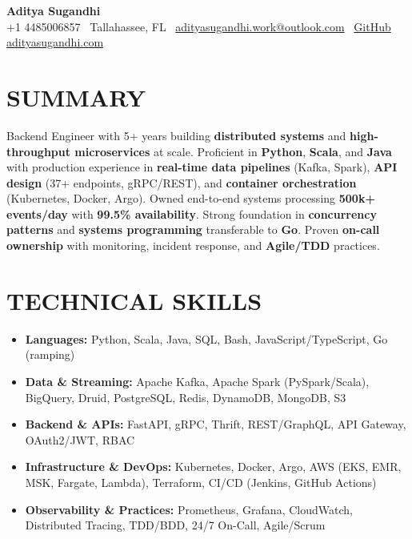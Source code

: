 \documentclass[letterpaper,10pt]{article}
\newcommand{\resumeItem}[1]{\item\small #1}
\begin{document}
\begin{center}
{\huge\textbf{Aditya Sugandhi}} \\
+1 4485006857 \textbar\ \textcolor{metablue}{Tallahassee, FL} \textbar\
\href{mailto:adityasugandhi.work@outlook.com}{adityasugandhi.work@outlook.com} \textbar\
\href{https://github.com/adityasugandhi}{GitHub}
\textbar \href{https://adityasugandhi.com}{adityasugandhi.com}
\end{center}
\vspace{-12pt}

\section{\textcolor{metablue}{SUMMARY}}
\small
\vspace{-6pt}
Backend Engineer with 5+ years building \textbf{distributed systems} and \textbf{high-throughput microservices} at scale. Proficient in \textbf{Python}, \textbf{Scala}, and \textbf{Java} with production experience in \textbf{real-time data pipelines} (Kafka, Spark), \textbf{API design} (37+ endpoints, gRPC/REST), and \textbf{container orchestration} (Kubernetes, Docker, Argo). Owned end-to-end systems processing \textbf{500k+ events/day} with \textbf{99.5\% availability}. Strong foundation in \textbf{concurrency patterns} and \textbf{systems programming} transferable to \textbf{Go}. Proven \textbf{on-call ownership} with monitoring, incident response, and \textbf{Agile/TDD} practices.

\vspace{-9pt}

\section{\textcolor{metablue}{TECHNICAL SKILLS}}
\vspace{-5pt}
\small
\begin{itemize}
\resumeItem{\textbf{Languages:} Python, Scala, Java, SQL, Bash, JavaScript/TypeScript, Go (ramping)}
\resumeItem{\textbf{Data \& Streaming:} Apache Kafka, Apache Spark (PySpark/Scala), BigQuery, Druid, PostgreSQL, Redis, DynamoDB, MongoDB, S3}
\resumeItem{\textbf{Backend \& APIs:} FastAPI, gRPC, Thrift, REST/GraphQL, API Gateway, OAuth2/JWT, RBAC}
\resumeItem{\textbf{Infrastructure \& DevOps:} Kubernetes, Docker, Argo, AWS (EKS, EMR, MSK, Fargate, Lambda), Terraform, CI/CD (Jenkins, GitHub Actions)}
\resumeItem{\textbf{Observability \& Practices:} Prometheus, Grafana, CloudWatch, Distributed Tracing, TDD/BDD, 24/7 On-Call, Agile/Scrum}
\end{itemize}
\vspace{-10pt}
\end{document}
